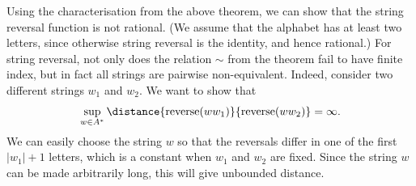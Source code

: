 \begin{myexample}
   \label{ex:string-reversal-not-rational} Using the characterisation from the above theorem, we can show that the string reversal function is not rational. (We assume that the alphabet has at least two letters, since otherwise string reversal is the identity, and hence rational.) For string reversal, not only does the relation $\sim$ from the theorem fail to have finite index, but in fact all strings are pairwise non-equivalent. Indeed, consider two different strings $w_1$ and $w_2$. We want to show that 
\begin{align*}
\sup_{w \in A^*} \distance{\text{reverse}(ww_1)}{\text{reverse}(ww_2)} = \infty.
\end{align*}
We can easily choose the string $w$ so that the reversals differ in one of the first $|w_1|+1$ letters, which is a constant when $w_1$ and $w_2$ are fixed. Since the string $w$ can be made arbitrarily long, this will give unbounded distance.
\end{myexample}


\exerciseheader

